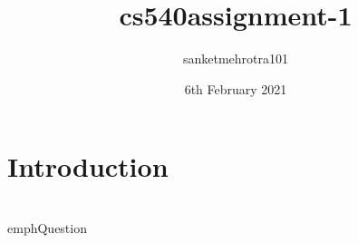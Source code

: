 \documentclass{article}
\title{cs540assignment-1}
\author{sanketmehrotra101 }
\date{6th February 2021}
\begin{document}
\maketitle

\section{Introduction}

\\emph{Question}
\end{document}
